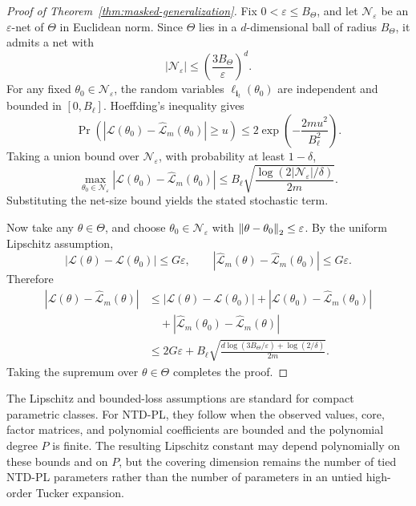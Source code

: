 \begin{proof}[Proof of Theorem~\ref{thm:masked-generalization}]
Fix \(0<\varepsilon\le B_\Theta\), and let
\(\mathcal N_\varepsilon\) be an \(\varepsilon\)-net of \(\Theta\) in
Euclidean norm. Since \(\Theta\) lies in a \(d\)-dimensional ball of radius
\(B_\Theta\), it admits a net with
\begin{equation}
  |\mathcal N_\varepsilon|
  \le
  \left(\frac{3B_\Theta}{\varepsilon}\right)^d.
\end{equation}
For any fixed \(\theta_0\in\mathcal N_\varepsilon\), the random variables
\(\ell_{\mathbf i_t}(\theta_0)\) are independent and bounded in
\([0,B_\ell]\). Hoeffding's inequality gives
\begin{equation}
  \Pr\left(
  \left|
  \mathcal L(\theta_0)-\widehat{\mathcal L}_m(\theta_0)
  \right|
  \ge u
  \right)
  \le
  2\exp\left(-\frac{2mu^2}{B_\ell^2}\right).
\end{equation}
Taking a union bound over \(\mathcal N_\varepsilon\), with probability at
least \(1-\delta\),
\begin{equation}
  \max_{\theta_0\in\mathcal N_\varepsilon}
  \left|
  \mathcal L(\theta_0)-\widehat{\mathcal L}_m(\theta_0)
  \right|
  \le
  B_\ell
  \sqrt{
  \frac{
  \log(2|\mathcal N_\varepsilon|/\delta)}
  {2m}}.
\end{equation}
Substituting the net-size bound yields the stated stochastic term.

Now take any \(\theta\in\Theta\), and choose
\(\theta_0\in\mathcal N_\varepsilon\) with
\(\left\lVert \theta-\theta_0 \right\rVert_2\le\varepsilon\). By the uniform Lipschitz
assumption,
\begin{equation}
  |\mathcal L(\theta)-\mathcal L(\theta_0)|
  \le G\varepsilon,
  \qquad
  |\widehat{\mathcal L}_m(\theta)-\widehat{\mathcal L}_m(\theta_0)|
  \le G\varepsilon.
\end{equation}
Therefore
\begin{align}
  \left|
  \mathcal L(\theta)-\widehat{\mathcal L}_m(\theta)
  \right|
  &\le
  |\mathcal L(\theta)-\mathcal L(\theta_0)|
  +
  \left|
  \mathcal L(\theta_0)-\widehat{\mathcal L}_m(\theta_0)
  \right| \\
  &\quad+
  |\widehat{\mathcal L}_m(\theta_0)-\widehat{\mathcal L}_m(\theta)| \\
  &\le
  2G\varepsilon
  +
  B_\ell
  \sqrt{
  \frac{
  d\log(3B_\Theta/\varepsilon)+\log(2/\delta)}
  {2m}}.
\end{align}
Taking the supremum over \(\theta\in\Theta\) completes the proof.
\end{proof}

\begin{remark}
The Lipschitz and bounded-loss assumptions are standard for compact
parametric classes. For NTD-PL, they follow when the observed values, core,
factor matrices, and polynomial coefficients are bounded and the polynomial
degree \(P\) is finite. The resulting Lipschitz constant may depend
polynomially on these bounds and on \(P\), but the covering dimension remains
the number of tied NTD-PL parameters rather than the number of parameters in
an untied high-order Tucker expansion.
\end{remark}

